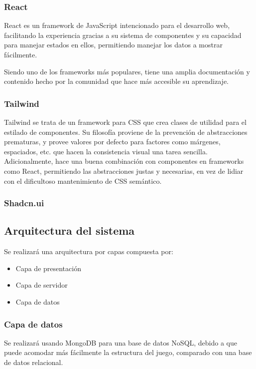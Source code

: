 \subsubsection{React}
React es un framework de JavaScript intencionado para el desarrollo web, facilitando
la experiencia gracias a su sistema de componentes y su capacidad para manejar
estados en ellos, permitiendo manejar los datos a mostrar fácilmente.

Siendo uno de los frameworks más populares, tiene una amplia documentación
y contenido hecho por la comunidad que hace más accesible su aprendizaje.

\subsubsection{Tailwind}
Tailwind se trata de un framework para CSS que crea clases de utilidad para el estilado de componentes.
Su filosofía proviene de la prevención de abstracciones prematuras, y provee valores por
defecto para factores como márgenes, espaciados, etc. que hacen la consistencia visual una tarea
sencilla.
Adicionalmente, hace una buena combinación con componentes en frameworks como React,
permitiendo las abstracciones justas y necesarias, en vez de lidiar con el dificultoso
mantenimiento de CSS semántico.

\subsubsection{Shadcn.ui}


\subsection{Arquitectura del sistema}

Se realizará una arquitectura por capas compuesta por:

\begin{itemize}
  \item Capa de presentación
  \item Capa de servidor
  \item Capa de datos
\end{itemize}

\subsubsection{Capa de datos}
Se realizará usando MongoDB para una base de datos NoSQL,
debido a que puede acomodar más fácilmente la estructura del juego,
comparado con una base de datos relacional.

